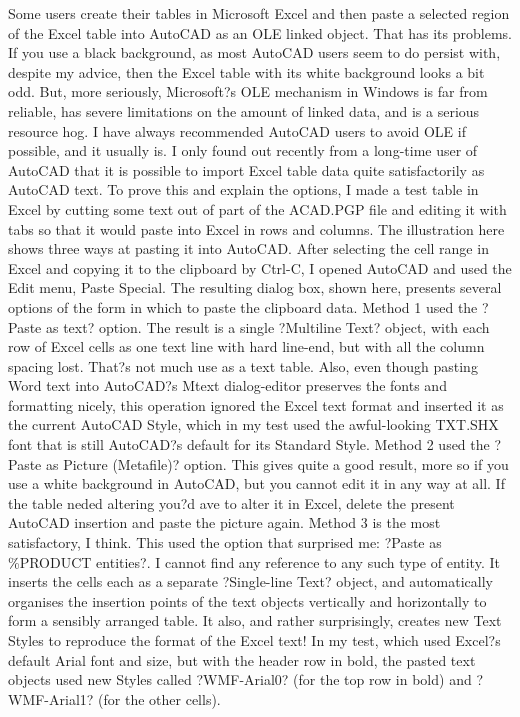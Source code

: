 \documentclass[a4paper]{article}
\begin{document}
Some users create their tables in Microsoft Excel and then paste a selected region of the Excel table into AutoCAD as an OLE linked object. That has its problems. If you use a black background, as most AutoCAD users seem to do persist with, despite my advice, then the Excel table with its white background looks a bit odd. But, more seriously, Microsoft?s OLE mechanism in Windows is far from reliable, has severe limitations on the amount of linked data, and is a serious resource hog. I have always recommended AutoCAD users to avoid OLE if possible, and it usually is.
I only found out recently from a long-time user of AutoCAD that it is possible to import Excel table data quite satisfactorily as AutoCAD text. To prove this and explain the options, I made a test table in Excel by cutting some text out of part of the ACAD.PGP file and editing it with tabs so that it would paste into Excel in rows and columns. The illustration here shows three ways at pasting it into AutoCAD. After selecting the cell range in Excel and copying it to the clipboard by Ctrl-C, I opened AutoCAD and used the Edit menu, Paste Special. The resulting dialog box, shown here, presents several options of the form in which to paste the clipboard data.
Method 1 used the ?Paste as text? option. The result is a single ?Multiline Text? object, with each row of Excel cells as one text line with hard line-end, but with all the column spacing lost. That?s not much use as a text table. Also, even though pasting Word text into AutoCAD?s Mtext dialog-editor preserves the fonts and formatting nicely, this operation ignored the Excel text format and inserted it as the current AutoCAD Style, which in my test used the awful-looking TXT.SHX font that is still AutoCAD?s default for its Standard Style.
Method 2 used the ?Paste as Picture (Metafile)? option. This gives quite a good result, more so if you use a white background in AutoCAD, but you cannot edit it in any way at all. If the table neded altering you?d ave to alter it in Excel, delete the present AutoCAD insertion and paste the picture again.
Method 3 is the most satisfactory, I think. This used the option that surprised me: ?Paste as \%PRODUCT entities?. I cannot find any reference to any such type of entity. It inserts the cells each as a separate ?Single-line Text? object, and automatically organises the insertion points of the text objects vertically and horizontally to form a sensibly arranged table. It also, and rather surprisingly, creates new Text Styles to reproduce the format of the Excel text! In my test, which used Excel?s default Arial font and size, but with the header row in bold, the pasted text objects used new Styles called ?WMF-Arial0? (for the top row in bold) and ?WMF-Arial1? (for the other cells).
\end{document}
